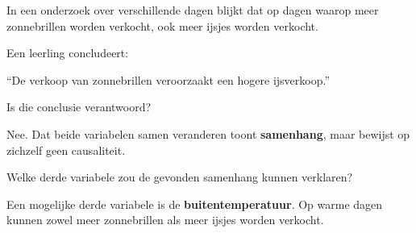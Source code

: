 \documentclass{ximera}
\begin{document}
\begin{oefening}{\oefU \ESS}

In een onderzoek over verschillende dagen blijkt dat op dagen waarop
meer zonnebrillen worden verkocht, ook meer ijsjes worden verkocht.

Een leerling concludeert:

\begin{center}
``De verkoop van zonnebrillen veroorzaakt een hogere ijsverkoop.''
\end{center}

\begin{question}
Is die conclusie verantwoord?

\begin{multipleChoice}
\end{multipleChoice}


\begin{oplossing}
Nee. Dat beide variabelen samen veranderen toont \textbf{samenhang},
maar bewijst op zichzelf geen causaliteit.
\end{oplossing}

\end{question}

\begin{question}
Welke derde variabele zou de gevonden samenhang kunnen verklaren?

\begin{multipleChoice}
\end{multipleChoice}


\begin{oplossing}
Een mogelijke derde variabele is de \textbf{buitentemperatuur}.
Op warme dagen kunnen zowel meer zonnebrillen als meer ijsjes worden verkocht.
\end{oplossing}

\end{question}

\end{oefening}


\end{document}
